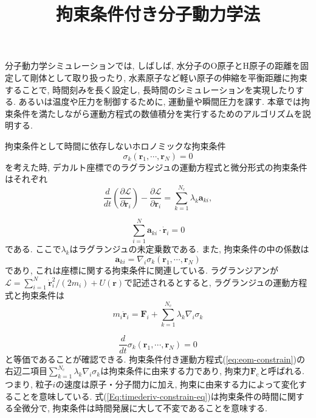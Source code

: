





\title{拘束条件付き分子動力学法}
\maketitle

分子動力学シミュレーションでは, しばしば, 水分子のO原子とH原子の距離を固定して剛体として取り扱ったり, 水素原子など軽い原子の伸縮を平衡距離に拘束することで, 時間刻みを長く設定し, 長時間のシミュレーションを実現したりする. 
あるいは温度や圧力を制御するために, 運動量や瞬間圧力を課す.
本章では拘束条件を満たしながら運動方程式の数値積分を実行するためのアルゴリズムを説明する. 

拘束条件として時間に依存しないホロノミックな拘束条件
\begin{equation}
    \sigma_{k} (\bm{r}_{1},\cdots, \bm{r}_{N}) = 0
\end{equation}
を考えた時, デカルト座標でのラグランジュの運動方程式と微分形式の拘束条件はそれぞれ
\begin{equation}
    \frac{d}{dt} \left(\frac{\partial \mathcal{L}}{\partial \dot{\bm{r}}_{i}} \right) -\frac{\partial \mathcal{L}}{\partial \bm{r}_{i}} = \sum_{k=1}^{N_{\mathrm{c}}} \lambda_{k} \bm{a}_{ki},
\end{equation}

\begin{equation}
    \sum_{i=1}^{N} \bm{a}_{ki} \cdot \dot{\bm{r}}_{i} = 0
    \label{Eq:constrain-eq}
\end{equation}
である. 
ここで$\lambda_{k}$はラグランジュの未定乗数である. また, 拘束条件の中の係数は
\begin{equation}
    \bm{a}_{ki} = \nabla_{i} \sigma_{k} (\bm{r}_{1}, \cdots, \bm{r}_{N})
    \label{Eq:constrain-eq-position}
\end{equation}
であり, これは座標に関する拘束条件に関連している. 
ラグランジアンが$\mathcal{L}=\sum_{i=1}^{N} \dot{\bm{r}}_{i}^{2}/(2m_{i}) + U(\bm{r})$で記述されるとすると, ラグランジュの運動方程式と拘束条件は
\begin{equation}
    m_{i} \ddot{\bm{r}}_{i}
    =
    \bm{F}_{i} + \sum_{k=1}^{N_{\mathrm{c}}} \lambda_{k} \nabla_{i} \sigma_{k}
    \label{eq:eom-constrain}
\end{equation}

\begin{equation}
    \frac{d}{dt} \sigma_{k} (\bm{r}_{1},\cdots, \bm{r}_{N}) = 0
    \label{Eq:timederiv-constrain-eq}
\end{equation}
と等価であることが確認できる. 拘束条件付き運動方程式(\ref{eq:eom-constrain})の右辺二項目$\sum_{k=1}^{N_{\mathrm{c}}} \lambda_{k} \nabla_{i} \sigma_{k}$は拘束条件に由来する力であり, 拘束力$\bm{F}_{\mathrm{c}}$と呼ばれる. つまり, 粒子$i$の速度は原子・分子間力に加え, 拘束に由来する力によって変化することを意味している. 
式(\ref{Eq:timederiv-constrain-eq})は拘束条件の時間に関する全微分で, 拘束条件は時間発展に大して不変であることを意味する. 

